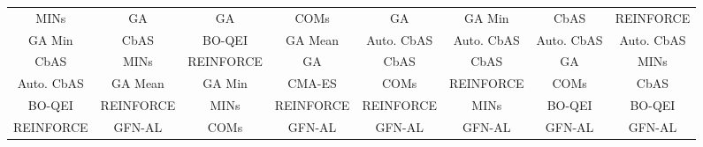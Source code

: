 \begin{table*}[h!]
\begin{minipage}{.9\textwidth}
\begin{adjustbox}{width=\linewidth,center}
\begin{tabular}{|c|c|c|c|c|c|c|c|}
\cellcolor[HTML]{D0E0E3}MINs & \cellcolor[HTML]{D9D2E9}GA & \cellcolor[HTML]{D9D2E9}GA & \cellcolor[HTML]{C9DAF8}COMs  & \cellcolor[HTML]{D9D2E9}GA & \cellcolor[HTML]{CFE2F3}GA Min & \cellcolor[HTML]{FCE5CD}CbAS & \cellcolor[HTML]{FFF2CC}REINFORCE \\ 
\cellcolor[HTML]{CFE2F3}GA Min & \cellcolor[HTML]{FCE5CD}CbAS & \cellcolor[HTML]{B5DDCA}BO-QEI & \cellcolor[HTML]{F4CCCC}GA Mean  & \cellcolor[HTML]{D9EAD3}Auto. CbAS & \cellcolor[HTML]{D9EAD3}Auto. CbAS & \cellcolor[HTML]{D9EAD3}Auto. CbAS & \cellcolor[HTML]{D9EAD3}Auto. CbAS \\ 
\cellcolor[HTML]{FCE5CD}CbAS & \cellcolor[HTML]{D0E0E3}MINs & \cellcolor[HTML]{FFF2CC}REINFORCE & \cellcolor[HTML]{D9D2E9}GA & \cellcolor[HTML]{FCE5CD}CbAS & \cellcolor[HTML]{FCE5CD}CbAS & \cellcolor[HTML]{D9D2E9}GA & \cellcolor[HTML]{D0E0E3}MINs \\ 
\cellcolor[HTML]{D9EAD3}Auto. CbAS & \cellcolor[HTML]{F4CCCC}GA Mean  & \cellcolor[HTML]{CFE2F3}GA Min & \cellcolor[HTML]{EAD1DC}CMA-ES & \cellcolor[HTML]{C9DAF8}COMs  & \cellcolor[HTML]{FFF2CC}REINFORCE & \cellcolor[HTML]{C9DAF8}COMs  & \cellcolor[HTML]{FCE5CD}CbAS \\ 
\cellcolor[HTML]{B5DDCA}BO-QEI & \cellcolor[HTML]{FFF2CC}REINFORCE & \cellcolor[HTML]{D0E0E3}MINs & \cellcolor[HTML]{FFF2CC}REINFORCE & \cellcolor[HTML]{FFF2CC}REINFORCE & \cellcolor[HTML]{D0E0E3}MINs & \cellcolor[HTML]{B5DDCA}BO-QEI & \cellcolor[HTML]{B5DDCA}BO-QEI \\ 
\cellcolor[HTML]{FFF2CC}REINFORCE & \cellcolor[HTML]{F8E3A6}GFN-AL  & \cellcolor[HTML]{C9DAF8}COMs  & \cellcolor[HTML]{F8E3A6}GFN-AL  & \cellcolor[HTML]{F8E3A6}GFN-AL  & \cellcolor[HTML]{F8E3A6}GFN-AL  & \cellcolor[HTML]{F8E3A6}GFN-AL  & \cellcolor[HTML]{F8E3A6}GFN-AL  \\
            \bottomrule
            \end{tabular}
            \end{adjustbox}
      

\end{minipage}
\end{table*}
